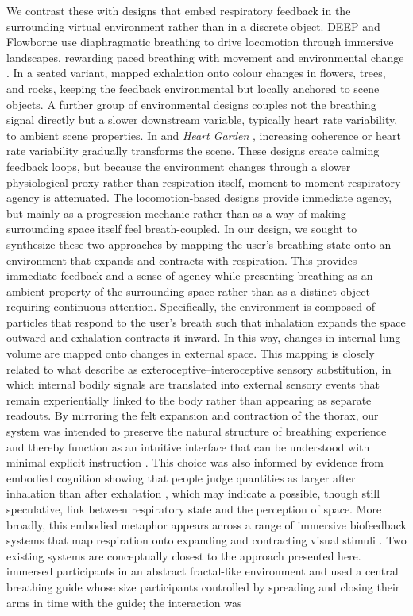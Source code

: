 We contrast these with designs that embed respiratory feedback in the surrounding virtual environment rather than in a discrete object. DEEP \citep{Bossenbroek2020, vanRooij2016} and Flowborne \citep{rockstroh2021mobile} use diaphragmatic breathing to drive locomotion through immersive landscapes, rewarding paced breathing with movement and environmental change \citep{Bossenbroek2020, rockstroh2021mobile}. In a seated variant, \citet{blum2020development} mapped exhalation onto colour changes in flowers, trees, and rocks, keeping the feedback environmental but locally anchored to scene objects. A further group of environmental designs couples not the breathing signal directly but a slower downstream variable, typically heart rate variability, to ambient scene properties. In \citet{blum2019heart} and \textit{Heart Garden} \citep{Rook2026}, increasing coherence or heart rate variability gradually transforms the scene. These designs create calming feedback loops, but because the environment changes through a slower physiological proxy rather than respiration itself, moment-to-moment respiratory agency is attenuated. The locomotion-based designs provide immediate agency, but mainly as a progression mechanic rather than as a way of making surrounding space itself feel breath-coupled. In our design, we sought to synthesize these two approaches by mapping the user's breathing state onto an environment that expands and contracts with respiration. This provides immediate feedback and a sense of agency while presenting breathing as an ambient property of the surrounding space rather than as a distinct object requiring continuous attention. Specifically, the environment is composed of particles that respond to the user's breath such that inhalation expands the space outward and exhalation contracts it inward. In this way, changes in internal lung volume are mapped onto changes in external space. This mapping is closely related to what \citet{GoralEtAl2024} describe as exteroceptive--interoceptive sensory substitution, in which internal bodily signals are translated into external sensory events that remain experientially linked to the body rather than appearing as separate readouts. By mirroring the felt expansion and contraction of the thorax, our system was intended to preserve the natural structure of breathing experience and thereby function as an intuitive interface that can be understood with minimal explicit instruction \citep{Antle2009}. This choice was also informed by evidence from embodied cognition showing that people judge quantities as larger after inhalation than after exhalation \citep{belli2021breathink}, which may indicate a possible, though still speculative, link between respiratory state and the perception of space. More broadly, this embodied metaphor appears across a range of immersive biofeedback systems that map respiration onto expanding and contracting visual stimuli \citep{Wald2023, GoralEtAl2024, barton2024restorative, StepanovaEtAl2020}. Two existing systems are conceptually closest to the approach presented here. \citet{barton2024restorative} immersed participants in an abstract fractal-like environment and used a central breathing guide whose size participants controlled by spreading and closing their arms in time with the guide; the interaction was 